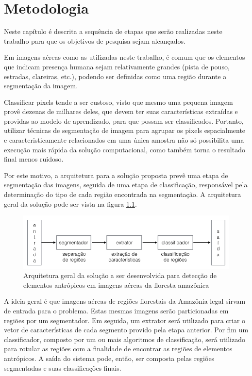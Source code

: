 \chapter{Metodologia}\label{cap:metodologia}

Neste capítulo é descrita a sequência de etapas que serão realizadas neste trabalho para que os objetivos de pesquisa sejam alcançados.

Em imagens aéreas como as utilizadas neste trabalho, é comum que os elementos que indicam presença humana sejam relativamente grandes (pista de pouso, estradas, clareiras, etc.), podendo ser definidas como uma região durante a segmentação da imagem.

Classificar pixels tende a ser custoso, visto que mesmo uma pequena imagem provê dezenas de milhares deles, que devem ter suas características extraídas e providas ao modelo de aprendizado, para que possam ser classificados. Portanto, utilizar técnicas de segmentação de imagem para agrupar os pixels espacialmente e caracteristicamente relacionados em uma única amostra não só possibilita uma execução mais rápida da solução computacional, como também torna o resultado final menos ruidoso.

Por este motivo, a arquitetura para a solução proposta prevê uma etapa de segmentação das imagens, seguida de uma etapa de classificação, responsável pela determinação do tipo de cada região encontrada na segmentação. A arquitetura geral da solução pode ser vista na figura \ref{fig:metDiagramaGeral}.

\begin{figure}[h]
    \includegraphics[width=\textwidth]{imgs/arquitetura_geral}
    \caption{Arquitetura geral da solução a ser desenvolvida para detecção de elementos antrópicos em imagens aéreas da floresta amazônica}
    \label{fig:metDiagramaGeral}
\end{figure}

A ideia geral é que imagens aéreas de regiões florestais da Amazônia legal sirvam de entrada para o problema. Estas mesmas imagens serão particionadas em regiões por um segmentador. Em seguida, um extrator será utilizado para criar o vetor de características de cada segmento provido pela etapa anterior. Por fim um classificador, composto por um ou mais algoritmos de classificação,  será utilizado para rotular as regiões com a finalidade de encontrar as regiões de elementos antrópicos. A saída do sistema pode, então, ser composta pelas regiões segmentadas e suas classificações finais.

